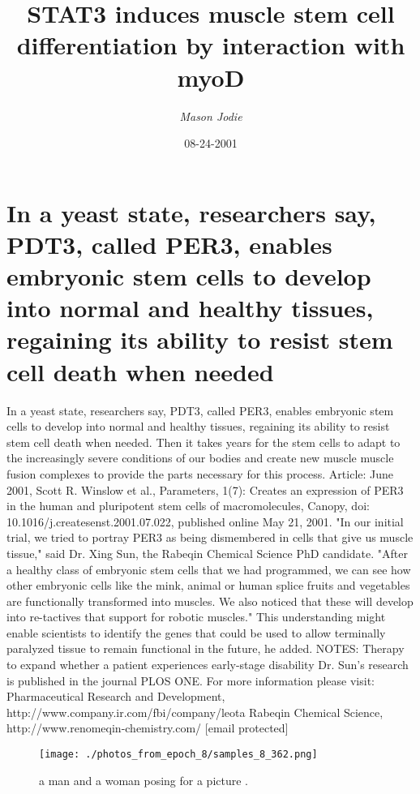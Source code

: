 \documentclass{article}%
\title{STAT3 induces muscle stem cell differentiation by interaction with myoD}%
\author{\textit{Mason Jodie}}%
\date{08-24-2001}%
\begin{document}
%
\normalsize%
\maketitle%
\section{In a yeast state, researchers say, PDT3, called PER3, enables embryonic stem cells to develop into normal and healthy tissues, regaining its ability to resist stem cell death when needed}%
\label{sec:Inayeaststate,researcherssay,PDT3,calledPER3,enablesembryonicstemcellstodevelopintonormalandhealthytissues,regainingitsabilitytoresiststemcelldeathwhenneeded}%
In a yeast state, researchers say, PDT3, called PER3, enables embryonic stem cells to develop into normal and healthy tissues, regaining its ability to resist stem cell death when needed. Then it takes years for the stem cells to adapt to the increasingly severe conditions of our bodies and create new muscle muscle fusion complexes to provide the parts necessary for this process.\newline%
Article: June 2001, Scott R. Winslow et al., Parameters, 1(7): Creates an expression of PER3 in the human and pluripotent stem cells of macromolecules, Canopy, doi: 10.1016/j.createsenst.2001.07.022, published online May 21, 2001.\newline%
"In our initial trial, we tried to portray PER3 as being dismembered in cells that give us muscle tissue," said Dr. Xing Sun, the Rabeqin Chemical Science PhD candidate. "After a healthy class of embryonic stem cells that we had programmed, we can see how other embryonic cells like the mink, animal or human splice fruits and vegetables are functionally transformed into muscles. We also noticed that these will develop into re{-}tactives that support for robotic muscles."\newline%
This understanding might enable scientists to identify the genes that could be used to allow terminally paralyzed tissue to remain functional in the future, he added.\newline%
NOTES:\newline%
Therapy to expand whether a patient experiences early{-}stage disability\newline%
Dr. Sun's research is published in the journal PLOS ONE.\newline%
For more information please visit:\newline%
Pharmaceutical Research and Development, http://www.company.ir.com/fbi/company/leota\newline%
Rabeqin Chemical Science, http://www.renomeqin{-}chemistry.com/\newline%
{[}email protected{]}\newline%

%


\begin{figure}[h!]%
\centering%
\texttt{[image: ./photos\_from\_epoch\_8/samples\_8\_362.png]}%
\caption{a man and a woman posing for a picture .}%
\end{figure}

%
\end{document}
